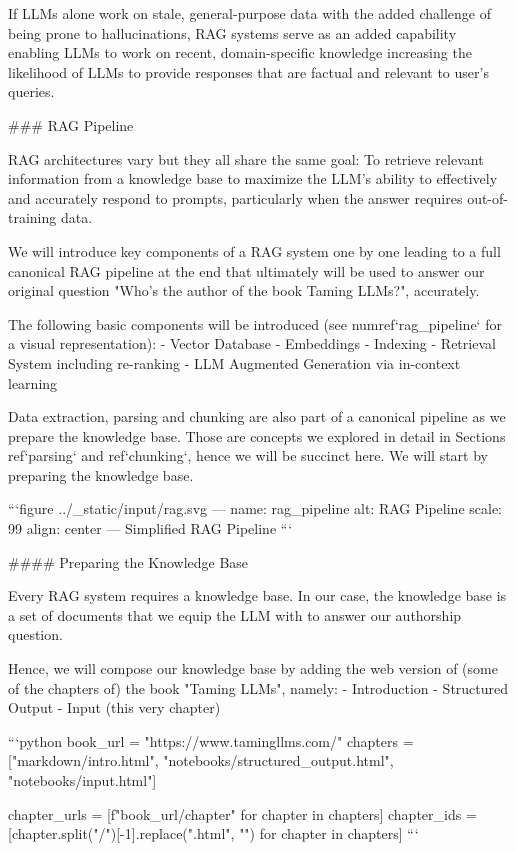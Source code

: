 {{If LLMs alone work on stale, general-purpose data with the added challenge of being prone to hallucinations, RAG systems serve as an added capability enabling LLMs to work on recent, domain-specific knowledge increasing the likelihood of LLMs to provide responses that are factual and relevant to user's queries.


### RAG Pipeline

RAG architectures vary but they all share the same goal: To retrieve relevant information from a knowledge base to maximize the LLM's ability to effectively and accurately respond to prompts, particularly when the answer requires out-of-training data.

We will introduce key components of a RAG system one by one leading to a full canonical RAG pipeline at the end that ultimately will be used to answer our original question "Who's the author of the book Taming LLMs?", accurately.

The following basic components will be introduced (see {numref}`rag_pipeline` for a visual representation):
- Vector Database
  - Embeddings
  - Indexing
- Retrieval System including re-ranking
- LLM Augmented Generation via in-context learning

Data extraction, parsing and chunking are also part of a canonical pipeline as we prepare the knowledge base. Those are concepts we explored in detail in Sections {ref}`parsing` and {ref}`chunking`, hence we will be succinct here. We will start by preparing the knowledge base.

```{figure} ../_static/input/rag.svg
---
name: rag_pipeline
alt: RAG Pipeline
scale: 99%
align: center
---
Simplified RAG Pipeline
```


#### Preparing the Knowledge Base

Every RAG system requires a knowledge base. In our case, the knowledge base is a set of documents that we equip the LLM with to answer our authorship question.

Hence, we will compose our knowledge base by adding the web version of (some of the chapters of) the book "Taming LLMs", namely:
- Introduction
- Structured Output
- Input (this very chapter)



```python
book_url = "https://www.tamingllms.com/"
chapters = ["markdown/intro.html",
            "notebooks/structured_output.html",
            "notebooks/input.html"]

chapter_urls = [f"{book_url}/{chapter}" for chapter in chapters]
chapter_ids = [chapter.split("/")[-1].replace(".html", "") for chapter in chapters]
```

}}
